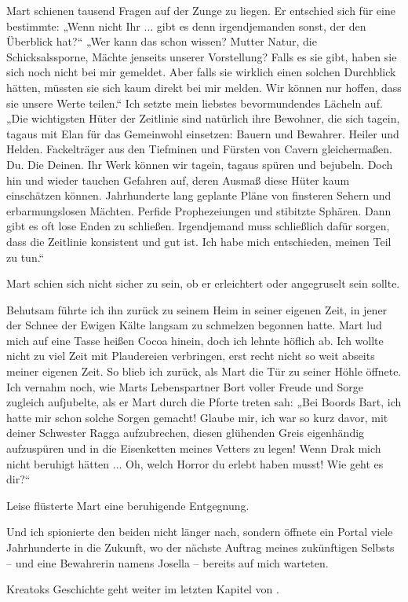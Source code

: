 Mart schienen tausend Fragen auf der Zunge zu liegen. Er entschied sich für eine bestimmte: „Wenn nicht Ihr ... gibt es denn irgendjemanden sonst, der den Überblick hat?“ „Wer kann das schon wissen? Mutter Natur, die Schicksalssporne, Mächte jenseits unserer Vorstellung? Falls es sie gibt, haben sie sich noch nicht bei mir gemeldet. Aber falls sie wirklich einen solchen Durchblick hätten, müssten sie sich kaum direkt bei mir melden. Wir können nur hoffen, dass sie unsere Werte teilen.“ Ich setzte mein liebstes bevormundendes Lächeln auf. „Die wichtigsten Hüter der Zeitlinie sind natürlich ihre Bewohner, die sich tagein, tagaus mit Elan für das Gemeinwohl einsetzen: Bauern und Bewahrer. Heiler und Helden. Fackelträger aus den Tiefminen und Fürsten von Cavern gleichermaßen. Du. Die Deinen. Ihr Werk können wir tagein, tagaus spüren und bejubeln. Doch hin und wieder tauchen Gefahren auf, deren Ausmaß diese Hüter kaum einschätzen können. Jahrhunderte lang geplante Pläne von finsteren Sehern und erbarmungslosen Mächten. Perfide Prophezeiungen und stibitzte Sphären. Dann gibt es oft lose Enden zu schließen. Irgendjemand muss schließlich dafür sorgen, dass die Zeitlinie konsistent und gut ist. Ich habe mich entschieden, meinen Teil zu tun.“ 

Mart schien sich nicht sicher zu sein, ob er erleichtert oder angegruselt sein sollte.

Behutsam führte ich ihn zurück zu seinem Heim in seiner eigenen Zeit, in jener der Schnee der Ewigen Kälte langsam zu schmelzen begonnen hatte. Mart lud mich auf eine Tasse heißen Cocoa hinein, doch ich lehnte höflich ab. Ich wollte nicht zu viel Zeit mit Plaudereien verbringen, erst recht nicht so weit abseits meiner eigenen Zeit. So blieb ich zurück, als Mart die Tür zu seiner Höhle öffnete. Ich vernahm noch, wie Marts Lebenspartner Bort voller Freude und Sorge zugleich aufjubelte, als er Mart durch die Pforte treten sah: „Bei Boords Bart, ich hatte mir schon solche Sorgen gemacht! Glaube mir, ich war so kurz davor, mit deiner Schwester Ragga aufzubrechen, diesen glühenden Greis eigenhändig aufzuspüren und in die Eisenketten meines Vetters zu legen! Wenn Drak mich nicht beruhigt hätten ... Oh, welch Horror du erlebt haben musst! Wie geht es dir?“ 

Leise flüsterte Mart eine beruhigende Entgegnung.

Und ich spionierte den beiden nicht länger nach, sondern öffnete ein Portal viele Jahrhunderte in die Zukunft, wo der nächste Auftrag meines zukünftigen Selbsts – und eine Bewahrerin namens Josella – bereits auf mich warteten. 


\begin{commentbox}
    Kreatoks Geschichte geht weiter im letzten Kapitel von .
\end{commentbox}

